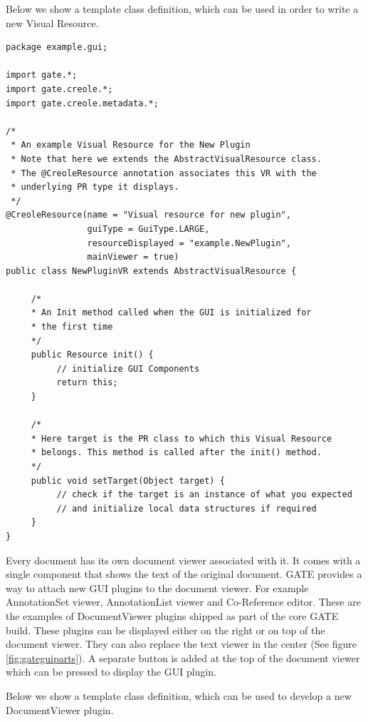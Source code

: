 
Below we show a template class definition, which can be used in order to write a
new Visual Resource.

\begin{lstlisting}
package example.gui;

import gate.*;
import gate.creole.*;
import gate.creole.metadata.*;

/*
 * An example Visual Resource for the New Plugin
 * Note that here we extends the AbstractVisualResource class.
 * The @CreoleResource annotation associates this VR with the
 * underlying PR type it displays.
 */
@CreoleResource(name = "Visual resource for new plugin",
                guiType = GuiType.LARGE, 
                resourceDisplayed = "example.NewPlugin",
                mainViewer = true)
public class NewPluginVR extends AbstractVisualResource {

     /* 
     * An Init method called when the GUI is initialized for
     * the first time
     */
     public Resource init() {
          // initialize GUI Components
          return this;
     }

     /*
     * Here target is the PR class to which this Visual Resource
     * belongs. This method is called after the init() method.
     */
     public void setTarget(Object target) {
          // check if the target is an instance of what you expected
          // and initialize local data structures if required
     }
}
\end{lstlisting}

Every document has its own document viewer associated with it. It comes with a
single component that shows the text of the original document. GATE provides a
way to attach new GUI plugins to the document viewer. For example AnnotationSet
viewer, AnnotationList viewer and Co-Reference editor. These are the examples of
DocumentViewer plugins shipped as part of the core GATE build. These plugins
can be displayed either on the right or on top of the document viewer. They can also
replace the text viewer in the center (See figure \ref{fig:gateguiparts}). A
separate button is added at the top of the document viewer which can be pressed
to display the GUI plugin.

Below we show a template class definition, which can be used to develop a new
DocumentViewer plugin.

